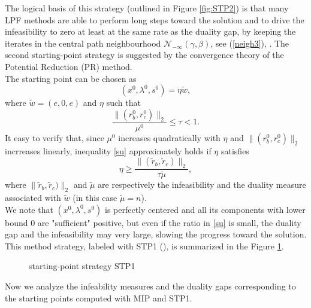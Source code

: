 \documentclass[a4paper,10 pt,titlepage,twoside]{book}
\theoremstyle{plain}
\theoremstyle{definition}
\theoremstyle{remark}
\begin{document}
The logical basis of this strategy (outlined in Figure \ref{fig:STP2}) is that many LPF methods are able to perform long steps toward the solution and to drive the infeasibility to zero at least at the same rate as the duality gap, by keeping the iterates in the central path neighbourhood $\mathcal{N}_{-\infty}(\gamma,\beta)$, see (\ref{neigh3}),  \cite{SPS}.
The second starting-point strategy is suggested by the convergence theory of the Potential Reduction (PR) method.\\
The starting point can be chosen as \begin{equation*}
(x^{0}, \lambda^{0}, s^{0}) = \eta \tilde{w},
\end{equation*}where $\tilde{w} = (e,0,e)$ and $\eta$ such that 
\begin{equation}\label{su}
\frac{\lVert(r^{0}_{b},r^{0}_{c})\rVert_{2}}{\mu^{0}}\leq \tau<1. 
\end{equation}
It easy to verify that, since $\mu^{0}$ increases quadratically with $\eta$ and $\lVert(r^{0}_{b},r^{0}_{c})\rVert_{2}$ incrreases linearly, inequality \ref{su} approximately holds if $\eta$ satisfies
\begin{equation*}
\eta\geq \frac{\lVert(\tilde{r}_{b},\tilde{r}_{c})\rVert_{2}}{\tau\tilde{\mu}},
\end{equation*}
where $\lVert\tilde{r}_{b},\tilde{r}_{c})\rVert_{2}$ and $\tilde{\mu}$ are respectively the infeasibility and the duality measure associated with $\tilde{w}$ (in this case $\tilde{\mu} = n$). \\
We note that $(x^{0},\lambda^{0},s^{0})$ is perfectly centered and all its components with lower bound 0 are "sufficient" positive, but even if the ratio in \ref{su} is small, the duality gap and the infeasibility may very large, slowing the progress toward the solution.\\
This method strategy, labeled with STP1 (\cite{SPS}), is summarized in the Figure \ref{fig:STP1}.\\
\begin{figure}[h]
	\begin{center}
\caption{\label{fig:STP1} starting-point strategy STP1}	
\end{center}
\end{figure}
Now we analyze the infeability measures and the duality gaps corresponding to the starting points computed with MIP and STP1.\\
\end{document}

